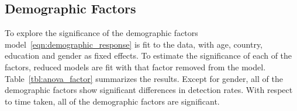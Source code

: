 \documentclass[10pt]{article}\usepackage[]{graphicx}\usepackage[]{xcolor}
\begin{document}
\subsection{Demographic Factors} 

To explore the significance of the demographic factors model~\eqref{eqn:demographic_response} is fit to the data, with age, country, education and gender as fixed effects. To estimate the significance of each of the factors, reduced models are fit with that factor removed from the model. Table~\ref{tbl:anova_factor} summarizes the results. Except for gender, all of the demographic factors show significant differences in  detection rates.  With respect to time taken, all of the demographic factors are significant. 

% 
\end{document}
